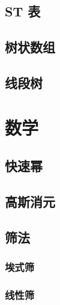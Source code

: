 \documentclass{article}
\begin{document}


\subsection{ST 表}



\subsection{树状数组}



\subsection{线段树}

\section{数学}

\subsection{快速幂}



\subsection{高斯消元}



\subsection{筛法}

\subsubsection{埃式筛}



\subsubsection{线性筛}


\end{document}
